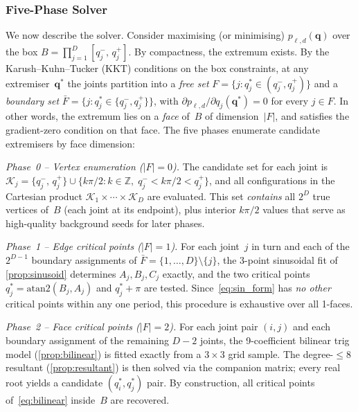 \documentclass[journal]{IEEEtran}
\begin{document}

\subsubsection{Five-Phase Solver}\label{sec:five_phase}

We now describe the solver.
Consider maximising (or minimising) $p_{\ell,d}(\bm{q})$ over the box
$B = \prod_{j=1}^{D} [q_j^-,\, q_j^+]$.
By compactness, the extremum exists.
By the Karush--Kuhn--Tucker (KKT) conditions on the box constraints,
at any extremiser~$\bm{q}^*$ the joints partition into
a \emph{free set}
$F = \{j : q_j^* \in (q_j^-,q_j^+)\}$ and a
\emph{boundary set} $\bar F = \{j : q_j^* \in \{q_j^-,q_j^+\}\}$,
with $\partial p_{\ell,d}/\partial q_j(\bm{q}^*) = 0$ for every
$j \in F$.
In other words, the extremum lies on a \emph{face} of~$B$ of
dimension~$|F|$, and satisfies the gradient-zero condition on
that face.
The five phases enumerate candidate extremisers by face dimension:

\emph{Phase~0 -- Vertex enumeration ($|F|=0$).}
The candidate set for each joint is
$\mathcal{K}_j = \{q_j^-,\, q_j^+\}
\cup \{ k\pi/2 : k\in \mathbb{Z},\;
q_j^- < k\pi/2 < q_j^+ \}$,
and all configurations in the Cartesian product
$\mathcal{K}_1 \times \cdots \times \mathcal{K}_D$ are evaluated.
This set \emph{contains} all $2^D$ true vertices of~$B$
(each joint at its endpoint), plus interior $k\pi/2$ values that
serve as high-quality background seeds for later phases.

\emph{Phase~1 -- Edge critical points ($|F|=1$).}
For each joint~$j$ in turn and each of the~$2^{D-1}$ boundary
assignments of $\bar F = \{1,\ldots,D\}\setminus\{j\}$,
the 3-point sinusoidal fit of \cref{prop:sinusoid} determines
$A_j, B_j, C_j$ exactly, and the two critical points
$q_j^* = \mathrm{atan2}(B_j,A_j)$ and $q_j^*+\pi$ are tested.
Since~\eqref{eq:sin_form} has \emph{no other} critical points within
any one period, this procedure is exhaustive over all 1-faces.

\emph{Phase~2 -- Face critical points ($|F|=2$).}
For each joint pair $(i,j)$ and each boundary assignment of the
remaining $D{-}2$ joints, the 9-coefficient bilinear trig model
(\cref{prop:bilinear}) is fitted exactly from a $3{\times}3$ grid
sample.
The degree-$\leq 8$ resultant (\cref{prop:resultant}) is then
solved via the companion matrix; every real root yields
a candidate $(q_i^*,q_j^*)$ pair.
By construction, all critical points of~\eqref{eq:bilinear}
inside~$B$ are recovered.
\end{document}
